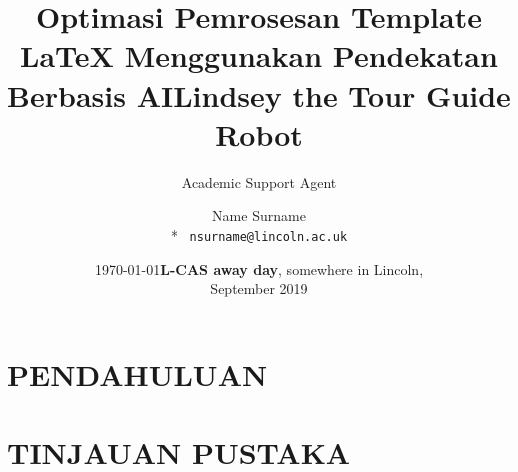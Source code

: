 \documentclass{beamer}
\title{Optimasi Pemrosesan Template LaTeX Menggunakan Pendekatan Berbasis AI}
\author{Academic Support Agent}
\date{\today}
\begin{document}
\maketitle

\begin{abstract}

\end{abstract}

\chapter{PENDAHULUAN}


\chapter{TINJAUAN PUSTAKA}


\usepackage{macros-ohp}
\usepackage{fontawesome}
\usepackage{lipsum}
\usepackage{multimedia}
\usepackage{setspace}
\usepackage{graphicx}



\def\presentationtitle{Lindsey the Tour Guide Robot }

\title{\presentationtitle}
\author[N. Surname]{{Name Surname} \\*
    {\footnotesize\faEnvelope \, \texttt{nsurname@lincoln.ac.uk}}
}


\date[L-CAS Away Day, Sept 2019]{\textbf{L-CAS away day}, somewhere in Lincoln,\\ September 2019}
\end{document}
